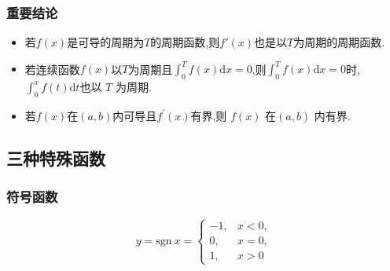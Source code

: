 \documentclass[12pt, a4paper, oneside, UTF8]{ctexbook}  %
\begin{document}
\begin{sloppypar}
    \subsubsection{重要结论}
    \begin{itemize}
        \item 若$f(x)$是可导的周期为$T$的周期函数,则$f'(x)$也是以$T$为周期的周期函数.
        \item 若连续函数$f(x)$以$T$为周期且$\int_{0}^{T}f(x)\mathrm{d}x=0$,则$\int_{0}^{T}f\left(x\right)\mathrm{d}x=0$时,$\int_{0}^{x}f\left(t\right)\mathrm{d}t$也以 $T$ 为周期.
        \item 若$f(x)$在$(a,b)$内可导且$f^{\prime}(x) $有界,则 $f(x)$ 在$(a,b)$ 内有界.
    \end{itemize}
    \subsection{三种特殊函数}
    \subsubsection{符号函数}
    $$
        y=\text{sgn} \ x=\begin{cases}-1,&x<0,\\0,&x=0,\\1,&x>0\end{cases}
    $$
    \begin{center}


\end{center}
\end{sloppypar}
\end{document}
